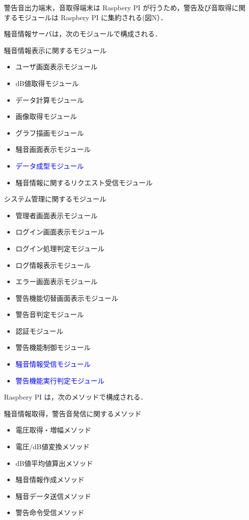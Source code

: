 警告音出力端末，音取得端末は Raspbery PI が行うため，警告及び音取得に関するモジュールは Raspbery PI に集約される(図N）．

騒音情報サーバは，次のモジュールで構成される．
  \begin{itembox}[l]{騒音情報表示に関するモジュール}
\begin{itemize}
\item ユーザ画面表示モジュール
\item dB値取得モジュール
\item データ計算モジュール
\item 画像取得モジュール
\item グラフ描画モジュール
\item 騒音画面表示モジュール
\item \textcolor{blue}{データ成型モジュール}
\item 騒音情報に関するリクエスト受信モジュール

\end{itemize}
  \end{itembox}

  \begin{itembox}[l]{システム管理に関するモジュール}
\begin{itemize}
\item 管理者画面表示モジュール
\item ログイン画面表示モジュール
\item ログイン処理判定モジュール
\item ログ情報表示モジュール
\item エラー画面表示モジュール
\item 警告機能切替画面表示モジュール
\item 警告音判定モジュール
\item 認証モジュール
\item 警告機能制御モジュール
\item \textcolor{blue}{騒音情報受信モジュール}
\item \textcolor{blue}{警告機能実行判定モジュール}
\end{itemize}
  \end{itembox}
 Raspbery PI は，次のメソッドで構成される．
  \begin{itembox}[l]{騒音情報取得，警告音発信に関するメソッド}
\begin{itemize}
\item 電圧取得・増幅メソッド
\item 電圧/dB値変換メソッド
\item dB値平均値算出メソッド
\item 騒音情報作成メソッド
\item 騒音データ送信メソッド
\item 警告命令受信メソッド
\end{itemize}
  \end{itembox}
\\
\\
\\


